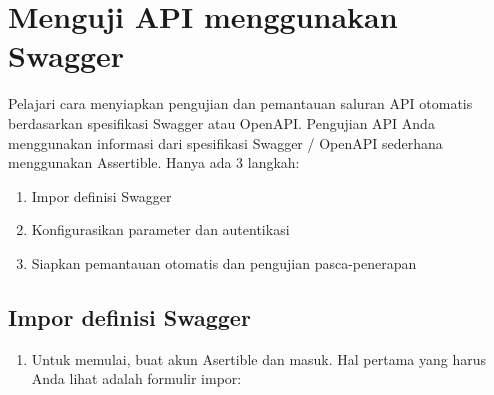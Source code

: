 \documentclass[12pt,a4paper]{article}
\begin{document}
\section{Menguji API menggunakan Swagger}
Pelajari cara menyiapkan pengujian dan pemantauan saluran API otomatis berdasarkan spesifikasi Swagger atau OpenAPI.
Pengujian API Anda menggunakan informasi dari spesifikasi Swagger / OpenAPI sederhana menggunakan Assertible. Hanya ada 3 langkah:
\begin{enumerate}
\item Impor definisi Swagger
\item Konfigurasikan parameter dan autentikasi
\item Siapkan pemantauan otomatis dan pengujian pasca-penerapan
\end{enumerate}

\subsection{Impor definisi Swagger}
\begin{enumerate}
\item Untuk memulai, buat akun Asertible dan masuk. Hal pertama yang harus Anda lihat adalah formulir impor:
\end{enumerate}
\end{document}
